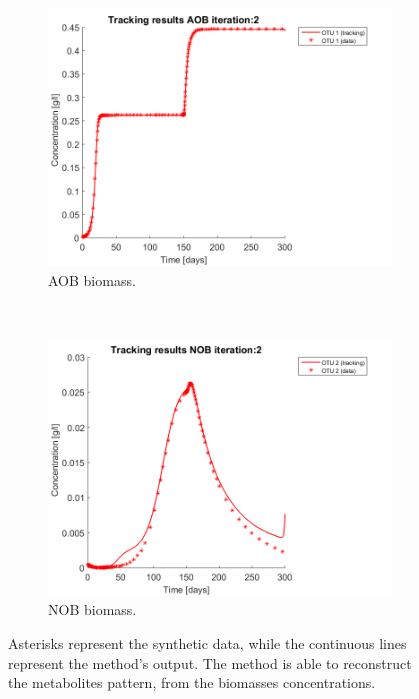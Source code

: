 \documentclass[3p,times]{article}
\begin{document}
\begin{figure}[h]
	\begin{subfigure}{0.45 \linewidth}
		\includegraphics[width=\textwidth]{proof_of_concept/250309_POC_try3_iter_2_AOB_plot_1}
		\caption{AOB biomass.}
		\label{PC_AOB}
	\end{subfigure}
	~
	\begin{subfigure}{0.45 \linewidth}
		\includegraphics[width=\textwidth]{proof_of_concept/250309_POC_try3_iter_2_NOB_plot_1}
		\caption{NOB biomass. }
		\label{PC_NOB}
	\end{subfigure}
\caption{Asterisks represent the synthetic data, while the continuous lines represent the method's output. The method is able to reconstruct the metabolites pattern, from the biomasses concentrations.}
\label{POC_tracking}
\end{figure}
\end{document}
